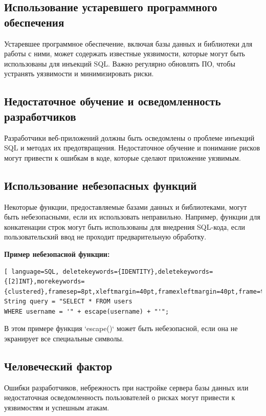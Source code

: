 \documentclass[a4paper,12pt]{diplom}
\begin{document}
	\subsection{Использование устаревшего программного обеспечения}
	
	Устаревшее программное обеспечение,  включая базы данных и библиотеки для работы с ними, может содержать известные уязвимости, которые могут быть использованы для инъекций SQL.  Важно регулярно обновлять ПО, чтобы устранять уязвимости и минимизировать риски.
	
	\subsection{Недостаточное обучение и осведомленность разработчиков}
	
	Разработчики веб-приложений должны быть осведомлены о проблеме инъекций SQL и методах их предотвращения. Недостаточное обучение и понимание рисков могут привести к ошибкам в коде, которые сделают приложение уязвимым.
	
	\subsection{Использование небезопасных функций}
	
	Некоторые функции, предоставляемые базами данных и библиотеками, могут быть небезопасными, если их использовать неправильно. Например, функции для конкатенации строк могут быть использованы для внедрения SQL-кода, если пользовательский ввод не проходит предварительную обработку. 
	
	\textbf{Пример небезопасной функции:}
	
	\begin{lstlisting}[ language=SQL, deletekeywords={IDENTITY},deletekeywords={[2]INT},morekeywords={clustered},framesep=8pt,xleftmargin=40pt,framexleftmargin=40pt,frame=tb,framerule=0pt]    
String query = "SELECT * FROM users 
WHERE username = '" + escape(username) + "'";
	\end{lstlisting}
	
	В этом примере функция `escape()`  может быть небезопасной, если она не экранирует все специальные символы. 
	
	\subsection{Человеческий фактор}
	
	Ошибки разработчиков,  небрежность при настройке сервера базы данных или недостаточная осведомленность пользователей о рисках могут привести к уязвимостям и успешным атакам.
	
\end{document}
